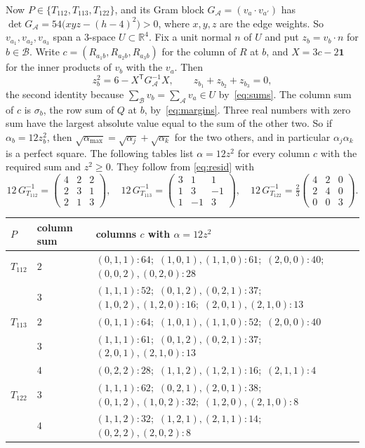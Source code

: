 \documentclass[11pt,a4paper]{amsart}
\theoremstyle{definition}
\theoremstyle{remark}
\newcommand{\R}{\mathbb{R}}
\newcommand{\one}{\mathbf{1}}
\newcommand{\cA}{\mathcal{A}}
\newcommand{\cB}{\mathcal{B}}
\begin{document}
Now $P\in\{T_{112},T_{113},T_{122}\}$, and its Gram block $G_\cA=(v_a\cdot v_{a'})$ has
$\det G_\cA=54\bigl(xyz-(h-4)^2\bigr)>0$, where $x,y,z$ are the edge weights. So $v_{a_1},v_{a_2},v_{a_3}$
span a $3$-space $U\subset\R^4$. Fix a unit normal $n$ of $U$ and put $z_b=v_b\cdot n$ for $b\in\cB$.
Write $c=(R_{a_1b},R_{a_2b},R_{a_3b})$ for the column of $R$ at $b$, and $X=3c-2\one$ for the inner
products of $v_b$ with the $v_a$. Then
\begin{equation}\label{eq:resid}
z_b^2=6-X^{\mathsf T}G_\cA^{-1}X,\qquad z_{b_1}+z_{b_2}+z_{b_3}=0,
\end{equation}
the second identity because $\sum_\cB v_b=\sum_\cA v_a\in U$ by~\eqref{eq:sums}. The column sum of $c$
is $\sigma_b$, the row sum of $Q$ at $b$, by~\eqref{eq:margins}. Three real numbers with zero sum have
the largest absolute value equal to the sum of the other two. So if $\alpha_b=12z_b^2$, then
$\sqrt{\alpha_{\max}}=\sqrt{\alpha_j}+\sqrt{\alpha_k}$ for the two others, and in particular
$\alpha_j\alpha_k$ is a perfect square. The following tables list $\alpha=12z^2$ for every column $c$ with
the required sum and $z^2\ge0$. They follow from \eqref{eq:resid} with
\[
12\,G^{-1}_{T_{112}}=\begin{pmatrix}4&2&2\\2&3&1\\2&1&3\end{pmatrix},\quad
12\,G^{-1}_{T_{113}}=\begin{pmatrix}3&1&1\\1&3&-1\\1&-1&3\end{pmatrix},\quad
12\,G^{-1}_{T_{122}}=\tfrac23\begin{pmatrix}4&2&0\\2&4&0\\0&0&3\end{pmatrix}.
\]

\begin{center}\small
\begin{tabular}{@{}lll@{}}
\toprule
$P$ & column sum & columns $c$ with $\alpha=12z^2$\\
\midrule
$T_{112}$ & $2$ & $(0,1,1)\!:64$;\ $(1,0,1),(1,1,0)\!:61$;\ $(2,0,0)\!:40$;\ $(0,0,2),(0,2,0)\!:28$\\
          & $3$ & $(1,1,1)\!:52$;\ $(0,1,2),(0,2,1)\!:37$;\ $(1,0,2),(1,2,0)\!:16$;\ $(2,0,1),(2,1,0)\!:13$\\
\midrule
$T_{113}$ & $2$ & $(0,1,1)\!:64$;\ $(1,0,1),(1,1,0)\!:52$;\ $(2,0,0)\!:40$\\
          & $3$ & $(1,1,1)\!:61$;\ $(0,1,2),(0,2,1)\!:37$;\ $(2,0,1),(2,1,0)\!:13$\\
          & $4$ & $(0,2,2)\!:28$;\ $(1,1,2),(1,2,1)\!:16$;\ $(2,1,1)\!:4$\\
\midrule
$T_{122}$ & $3$ & $(1,1,1)\!:62$;\ $(0,2,1),(2,0,1)\!:38$;\ $(0,1,2),(1,0,2)\!:32$;\ $(1,2,0),(2,1,0)\!:8$\\
          & $4$ & $(1,1,2)\!:32$;\ $(1,2,1),(2,1,1)\!:14$;\ $(0,2,2),(2,0,2)\!:8$\\
\bottomrule
\end{tabular}
\end{center}
\end{document}
